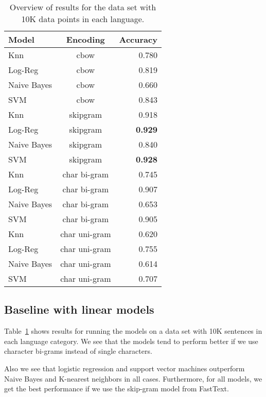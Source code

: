 \documentclass[11pt,a4paper]{article}
\begin{document}
\begin{table}
  \centering
  \begin{tabular}{ l | c | r }
    \hline
    Model               & Encoding  & Accuracy \\
    \hline
    Knn                 & cbow &  0.780\\
    Log-Reg             & cbow &  0.819\\
    Naive Bayes         & cbow &  0.660\\
    SVM                 & cbow &  0.843\\
    Knn                 & skipgram &  0.918\\
    Log-Reg             & skipgram &  \textbf{0.929}\\
    Naive Bayes         & skipgram &  0.840\\
    SVM                 & skipgram &  \textbf{0.928}\\
    Knn                 & char bi-gram  & 0.745\\
    Log-Reg             & char bi-gram  & 0.907\\
    Naive Bayes         & char bi-gram  & 0.653\\
    SVM                 & char bi-gram  & 0.905\\
    Knn                 & char uni-gram  & 0.620\\
    Log-Reg             & char uni-gram  & 0.755\\
    Naive Bayes         & char uni-gram  & 0.614\\
    SVM                 & char uni-gram  & 0.707\\
    \hline
  \end{tabular}
  \caption{Overview of results for the data set with 10K data points in each language.}
  \label{baseline-results-10k}
\end{table}

\subsection{Baseline with linear models}

Table~\ref{baseline-results-10k} shows results for running the models on a data set with 10K sentences in each language category. We see that the models tend to perform better if we use character bi-grams instead of single characters.

Also we see that logistic regression and support vector machines outperform Naive Bayes and K-nearest neighbors in all cases. Furthermore, for all models, we get the best performance if we use the skip-gram model from FastText.
\end{document}

